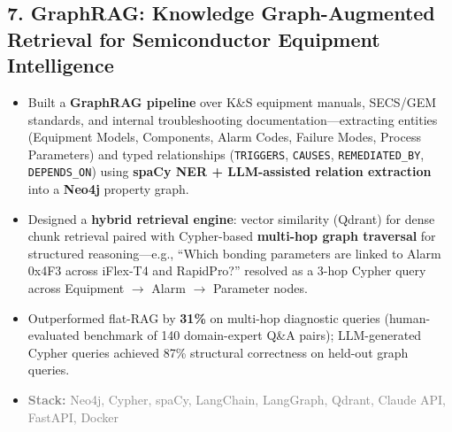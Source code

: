 \documentclass[11pt,a4paper]{article}
\newcommand{\projectstack}[1]{\textcolor{graytext}{\textbf{Stack:} #1}}
\begin{document}
\subsection{7. GraphRAG: Knowledge Graph-Augmented Retrieval for Semiconductor Equipment Intelligence}
\begin{itemize}[leftmargin=*, nosep, topsep=3pt]
    \item Built a \textbf{GraphRAG pipeline} over K\&S equipment manuals, SECS/GEM standards, and internal troubleshooting documentation---extracting entities (Equipment Models, Components, Alarm Codes, Failure Modes, Process Parameters) and typed relationships (\texttt{TRIGGERS}, \texttt{CAUSES}, \texttt{REMEDIATED\_BY}, \texttt{DEPENDS\_ON}) using \textbf{spaCy NER + LLM-assisted relation extraction} into a \textbf{Neo4j} property graph.
    \item Designed a \textbf{hybrid retrieval engine}: vector similarity (Qdrant) for dense chunk retrieval paired with Cypher-based \textbf{multi-hop graph traversal} for structured reasoning---e.g., ``Which bonding parameters are linked to Alarm 0x4F3 across iFlex-T4 and RapidPro?'' resolved as a 3-hop Cypher query across Equipment $\to$ Alarm $\to$ Parameter nodes.
    \item Outperformed flat-RAG by \textbf{31\%} on multi-hop diagnostic queries (human-evaluated benchmark of 140 domain-expert Q\&A pairs); LLM-generated Cypher queries achieved 87\% structural correctness on held-out graph queries.
    \item \projectstack{Neo4j, Cypher, spaCy, LangChain, LangGraph, Qdrant, Claude API, FastAPI, Docker}
\end{itemize}
\end{document}
